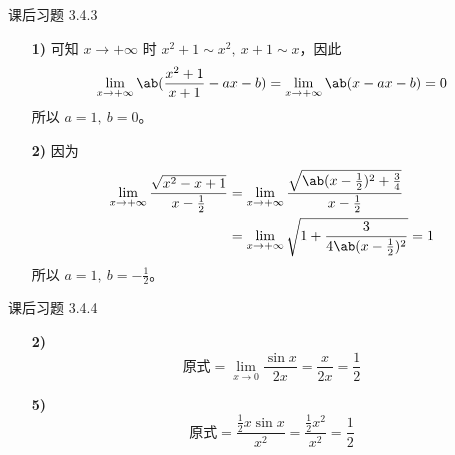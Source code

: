 \begin{problem}
	课后习题 3.4.3

	\begin{solution}
		\begin{enumerate}
			\item[\textbf{1)}] 可知 $x \to +\infty$ 时 $x^2 + 1 \sim x^2,\ x + 1 \sim x$，因此
			$$
			\lim_{x \to +\infty} \ab(\frac{x^2 + 1}{x + 1} - ax - b) = \lim_{x \to +\infty} \ab(x - ax - b) = 0
			$$
			所以 $a = 1,\ b = 0$。

			\item[\textbf{2)}] 因为
			$$
			\begin{aligned}
				\lim_{x \to +\infty} \frac{\sqrt{x^2 - x + 1}}{x - \frac{1}{2}} & = \lim_{x \to +\infty} \frac{\sqrt{\ab(x - \frac{1}{2})^2 + \frac{3}{4}}}{x - \frac{1}{2}} \\
				& = \lim_{x \to +\infty} \sqrt{1 + \frac{3}{4 \ab(x - \frac{1}{2})^2}} = 1
			\end{aligned}
			$$
			所以 $a = 1,\ b = -\frac{1}{2}$。
		\end{enumerate}
	\end{solution}
\end{problem}

\begin{problem}
	课后习题 3.4.4

	\begin{solution}
		\begin{enumerate}
			\item[\textbf{2)}]
			$$
			\text{原式} = \lim_{x \to 0} \frac{\sin x}{2 x} = \frac{x}{2 x} = \frac{1}{2}
			$$
	
			\item[\textbf{5)}]
			$$
			\text{原式} = \frac{\frac{1}{2} x \sin x}{x^2} = \frac{\frac{1}{2} x^2}{x^2} = \frac{1}{2}
			$$
		\end{enumerate}
	\end{solution}
\end{problem}

